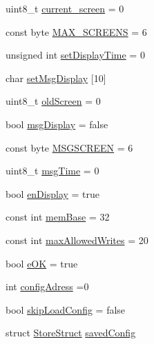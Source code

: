 \begin{DoxyCompactItemize}
uint8\+\_\+t \hyperlink{_u_s_b___tester___o_l_e_d__128x64___beta__2_82_8ino_a30232c834367e6367a7e5de7bd6cbc0f}{current\+\_\+screen} = 0
\item 
const byte \hyperlink{_u_s_b___tester___o_l_e_d__128x64___beta__2_82_8ino_a5e2774b0117f909142d2f673b8c99e74}{M\+A\+X\+\_\+\+S\+C\+R\+E\+E\+NS} = 6
\item 
unsigned int \hyperlink{_u_s_b___tester___o_l_e_d__128x64___beta__2_82_8ino_a9a01fa528c7bfc043a84a8f92a23f960}{set\+Display\+Time} = 0
\item 
char \hyperlink{_u_s_b___tester___o_l_e_d__128x64___beta__2_82_8ino_a26ad9acae8d3dcd907389adc92135c05}{set\+Msg\+Display} \mbox{[}10\mbox{]}
\item 
uint8\+\_\+t \hyperlink{_u_s_b___tester___o_l_e_d__128x64___beta__2_82_8ino_ae100f69e9887c2deede2ccc4a9561ba0}{old\+Screen} = 0
\item 
bool \hyperlink{_u_s_b___tester___o_l_e_d__128x64___beta__2_82_8ino_a494c8e9a14d682fe081912266b13b940}{msg\+Display} = false
\item 
const byte \hyperlink{_u_s_b___tester___o_l_e_d__128x64___beta__2_82_8ino_a886b137e995db5a273f9620e23a6a6a7}{M\+S\+G\+S\+C\+R\+E\+EN} = 6
\item 
uint8\+\_\+t \hyperlink{_u_s_b___tester___o_l_e_d__128x64___beta__2_82_8ino_aeb71c8d03cc720d2ead21eec89cf17bb}{msg\+Time} = 0
\item 
bool \hyperlink{_u_s_b___tester___o_l_e_d__128x64___beta__2_82_8ino_a667d79308e41c6eb5f768c939755b25c}{en\+Display} = true
\item 
const int \hyperlink{_u_s_b___tester___o_l_e_d__128x64___beta__2_82_8ino_a13885404e1de7a416a1423d656f4f7e5}{mem\+Base} = 32
\item 
const int \hyperlink{_u_s_b___tester___o_l_e_d__128x64___beta__2_82_8ino_ac7f173cc9bcbe593084850473ca7caf9}{max\+Allowed\+Writes} = 20
\item 
bool \hyperlink{_u_s_b___tester___o_l_e_d__128x64___beta__2_82_8ino_a47a1d5af8638165b1e811c05e5aad184}{e\+OK} = true
\item 
int \hyperlink{_u_s_b___tester___o_l_e_d__128x64___beta__2_82_8ino_af21ef1ec9601bef21ff0c845b44a6518}{config\+Adress} =0
\item 
bool \hyperlink{_u_s_b___tester___o_l_e_d__128x64___beta__2_82_8ino_a6e1501d7f376e2d03a4f9b9e5348635a}{skip\+Load\+Config} = false
\item 
struct \hyperlink{struct_store_struct}{Store\+Struct} \hyperlink{_u_s_b___tester___o_l_e_d__128x64___beta__2_82_8ino_aae9eaa04c38cc0832226c63e46ac334c}{saved\+Config}
\end{DoxyCompactItemize}


